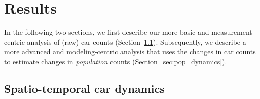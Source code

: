 \documentclass[sn-basic]{sn-jnl}%
\begin{document}
\section{Results}\label{Results}





In the following two sections, we first describe our more basic and measurement-centric analysis of (raw) car counts (Section~\ref{sec:car_dynamics}). Subsequently, we describe a more advanced and modeling-centric analysis that uses the changes in car counts to estimate changes in \emph{population} counts (Section~\ref{sec:pop_dynamics}).


\subsection{Spatio-temporal car dynamics}\label{sec:car_dynamics}
\end{document}
